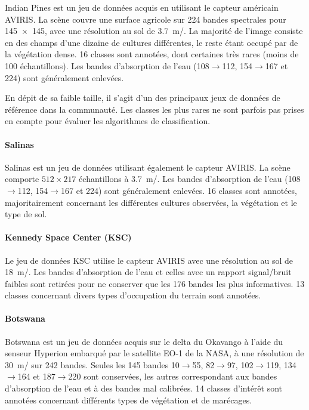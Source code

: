 Indian Pines est un jeu de données acquis en utilisant le capteur américain \gls{AVIRIS}. La scène couvre une surface agricole sur 224 bandes spectrales pour \SI{145x145}{\px}, avec une résolution au sol de \SI{3,7}{\meter/\px}. La majorité de l'image consiste en des champs d'une dizaine de cultures différentes, le reste étant occupé par de la végétation dense. 16 classes sont annotées, dont certaines très rares (moins de 100 échantillons). Les bandes d'absorption de l'eau (108$\rightarrow$112, 154$\rightarrow$167 et 224) sont généralement enlevées.

En dépit de sa faible taille, il s'agit d'un des principaux jeux de données de référence dans la communauté. Les classes les plus rares ne sont parfois pas prises en compte pour évaluer les algorithmes de classification.

\paragraph{Salinas}
Salinas est un jeu de données utilisant également le capteur \gls{AVIRIS}. La scène comporte $512\times217$ échantillons à \SI{3,7}{\meter/\px}. Les bandes d'absorption de l'eau (108$\rightarrow$112, 154$\rightarrow$167 et 224) sont généralement enlevées. 16 classes sont annotées, majoritairement concernant les différentes cultures observées, la végétation et le type de sol.

\paragraph{Kennedy Space Center (KSC)}
Le jeu de données KSC utilise le capteur \gls{AVIRIS} avec une résolution au sol de \SI{18}{\meter/\px}. Les bandes d'absorption de l'eau et celles avec un rapport signal/bruit faibles sont retirées pour ne conserver que les 176 bandes les plus informatives. 13 classes concernant divers types d'occupation du terrain sont annotées.

\paragraph{Botswana}
Botswana est un jeu de données acquis sur le delta du Okavango à l'aide du senseur Hyperion embarqué par le satellite EO-1 de la NASA, à une résolution de \SI{30}{\meter/\px} sur 242 bandes. Seules les 145 bandes 10$\rightarrow$55, 82$\rightarrow$97, 102$\rightarrow$119, 134$\rightarrow$164 et 187$\rightarrow$220 sont conservées, les autres correspondant aux bandes d'absorption de l'eau et à des bandes mal calibrées. 14 classes d'intérêt sont annotées concernant différents types de végétation et de marécages.

